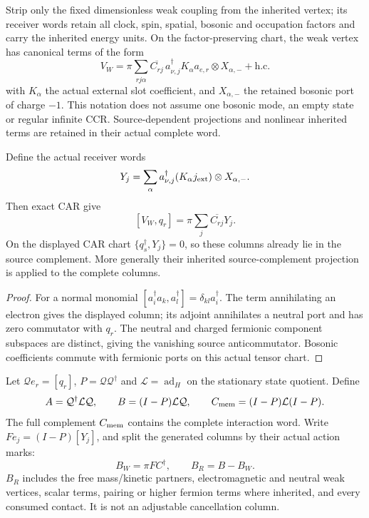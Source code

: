\documentclass[12pt,a4paper]{article}
\begin{document}
Strip only the fixed dimensionless weak coupling from the inherited
vertex; its receiver words retain all clock, spin, spatial, bosonic and
occupation factors and carry the inherited energy units. On the
factor-preserving chart, the weak vertex has canonical terms of the form
\[
 V_W=\pi\sum_{rj\alpha}
   \overline{C_{rj}}\,a_{\nu,j}^\dagger K_\alpha a_{e,r}
                   \otimes X_{\alpha,-}+\mathrm{h.c.}
\]
with $K_\alpha$ the actual external slot coefficient, and
$X_{\alpha,-}$ the retained bosonic port of charge $-1$.
This notation does not assume one bosonic mode, an empty state or regular
infinite CCR. Source-dependent projections and nonlinear inherited terms
are retained in their actual complete word.

\begin{proposition}
\label{p5c:prop:v2168-weak-receiver-columns}
Define the actual receiver words
\[
 Y_j=\sum_\alpha a_{\nu,j}^\dagger(K_\alpha j_{\rm ext})
                         \otimes X_{\alpha,-}.
\]
Then exact CAR give
\[
 \boxed{[V_W,q_r]=\pi\sum_j\overline{C_{rj}}Y_j.}
\]
On the displayed CAR chart $\{q_s^\dagger,Y_j\}=0$, so these columns
already lie in the source complement. More generally their inherited
source-complement projection is applied to the complete columns.
\end{proposition}
\begin{proof}
For a normal monomial
$[a_i^\dagger a_k,a_l^\dagger]=\delta_{kl}a_i^\dagger$.
The term annihilating an electron gives the displayed column; its adjoint
annihilates a neutral port and has zero commutator with $q_r$.
The neutral and charged fermionic component subspaces are distinct, giving
the vanishing source anticommutator. Bosonic coefficients commute with
fermionic ports on this actual tensor chart.
\end{proof}

Let $\mathcal Qe_r=[q_r]$, $P=\mathcal Q\mathcal Q^\dagger$ and
$\mathcal L=\operatorname{ad}_H$ on the stationary state quotient. Define
\[
 A=\mathcal Q^\dagger\mathcal L\mathcal Q,\qquad
 B=(I-P)\mathcal L\mathcal Q,\qquad
 C_{\rm mem}=(I-P)\mathcal L(I-P).
\]
The full complement $C_{\rm mem}$ contains the complete interaction word.
Write $F e_j=(I-P)[Y_j]$, and split the generated columns by their actual
action marks:
\[
 B_W=\pi F C^\dagger,\qquad B_R=B-B_W.
\]
$B_R$ includes the free mass/kinetic partners, electromagnetic and neutral
weak vertices, scalar terms, pairing or higher fermion terms where inherited,
and every consumed contact. It is not an adjustable cancellation column.
\end{document}
